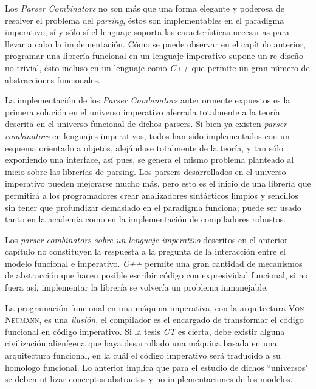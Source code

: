 
\begin{conclusiones}
	Los \emph{Parser Combinators} no son más que una forma elegante y poderosa de resolver el problema del \emph{parsing}, éstos son implementables en el paradigma imperativo, sí y sólo sí el lenguaje soporta las características necesarias para llevar a cabo la implementación. Cómo se puede observar en el capítulo anterior, programar una librería funcional en un lenguaje imperativo supone un re-diseño no trivial, ésto incluso en un lenguaje como \emph{C++} que permite un gran número de abstracciones funcionales. 
	
	La implementación de los \emph{Parser Combinators} anteriormente expuestos es la primera solución en el universo imperativo aferrada totalmente a la teoría descrita en el universo funcional de dichos parsers. Si bien ya existen \emph{parser combinators} en lenguajes imperativos, todos han sido implementados con un esquema orientado a objetos, alejándose totalmente de la teoría, y tan sólo exponiendo una interface, así pues, se genera el mismo problema planteado al inicio sobre las librerías de parsing. Los parsers desarrollados en el universo imperativo pueden mejorarse mucho más, pero esto es el inicio de una librería que permitirá a los programadores crear analizadores sintácticos limpios y sencillos sin tener que profundizar demasiado en el paradigma funciona; puede ser usado tanto en la academia como en la implementación de compiladores robustos.	
	
	
	Los \emph{parser combinators sobre un lenguaje imperativo} descritos en el anterior capítulo no constituyen la respuesta a la pregunta de la interacción entre el modelo funcional e imperativo. \emph{C++} permite una gran cantidad de mecanismos de abstracción que hacen posible escribir código con expresividad funcional, si no fuera así, implementar la librería se volvería un problema inmanejable.
	
	La programación funcional en una máquina imperativa, con la arquitectura \textsc{Von Neumann}, es una \emph{ilusión}, el compilador es el encargado de transformar el código funcional en código imperativo. Si la tesis \emph{CT} es cierta, debe existir alguna civilización alienígena que haya desarrollado una máquina basada en una arquitectura funcional, en la cuál el código imperativo será traducido a su homologo funcional. Lo anterior implica que para el estudio de dichos ``universos" se deben utilizar conceptos abstractos y no implementaciones de los modelos.
	

\end{conclusiones}
